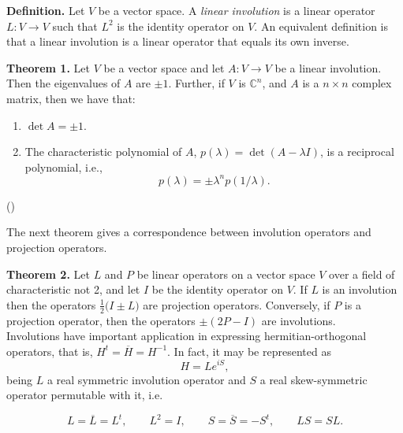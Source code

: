 \documentclass[12pt]{article}
\newcommand{\sC}[0]{\mathbb{C}}
\begin{document}
{\bf Definition.}
 Let $V$ be a vector space.
 A \emph{ linear involution} is a linear
 operator $L:V\to V$ such that $L^2$ is the identity operator on $V$.
An equivalent definition is that  a linear involution is a linear operator that 
equals its own inverse.

{\bf Theorem 1.} Let $V$ be a vector space and let $A:V\to V$ be a linear involution.
Then the eigenvalues of $A$ are $\pm 1$. Further,
if $V$ is $\sC^n$, and $A$ is a $n\times n$ complex matrix, then we have that:
\begin{enumerate}
\item $\det A = \pm 1$.
\item The characteristic polynomial of $A$, $p(\lambda) = \det( A-\lambda I)$,
is a reciprocal polynomial, i.e.,
$$ p(\lambda) = \pm \lambda^n p(1/\lambda).$$
\end{enumerate}
()

The next theorem gives a correspondence between involution
 operators and projection operators.

{\bf Theorem 2.} Let $L$ and $P$ be linear operators on a
 vector space $V$ over a field of characteristic not 2, and let $I$ be the identity operator on $V$.
 If $L$ is an involution then
 the operators $\frac{1}{2}\big(I\pm L\big)$
 are projection operators.
 Conversely, if $P$ is a projection operator, then
 the operators $\pm(2P-I)$ are involutions. \\

Involutions have important application in expressing hermitian-orthogonal operators, that is, $H^t=\overline{H}=H^{-1}$. In fact, it may be represented as 
$$H=Le^{iS},$$
being $L$ a real symmetric involution operator and $S$ a real skew-symmetric operator permutable with it, i.e.

$$L=\overline{L}=L^t, \qquad L^2=I, \qquad S=\overline{S}=-S^t, \qquad LS=SL.$$
\end{document}
